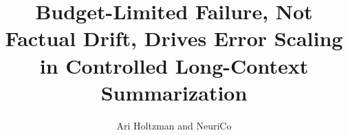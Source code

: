\documentclass{article}
\title{Budget-Limited Failure, Not Factual Drift, Drives Error Scaling in Controlled Long-Context Summarization}
\author{Ari Holtzman and NeuriCo}
\begin{document}
\maketitle

\begin{abstract}

\end{abstract}









\end{document}

